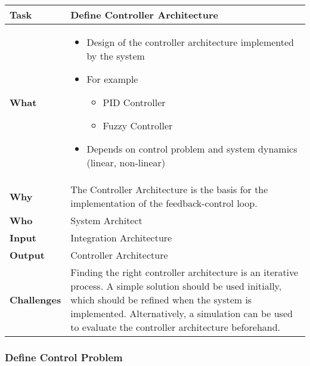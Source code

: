 \begin{tabularx}{\textwidth}{@{} l X @{}}
	\caption{Define Controller Architecture} \label{table:ch6_Task_Define_Controller_Architecture}\\
	\toprule 
	\bfseries Task & Define Controller Architecture\\
	\midrule 
	\bfseries What & 
	\begin{itemize}
		\item Design of the controller architecture implemented by the system
		\item For example
		\begin{itemize}
			\item PID Controller
			\item Fuzzy Controller
		\end{itemize}
		\item Depends on control problem and system dynamics (linear, non-linear)
	\end{itemize}
	\\
	\midrule 
	\bfseries Why & The Controller Architecture is the basis for the implementation of the feedback-control loop.\\
	\midrule 
	\bfseries Who & System Architect\\
	\midrule 
	\bfseries Input & Integration Architecture\\
	\midrule 
	\bfseries Output & Controller Architecture\\
	\midrule 
	\bfseries Challenges & Finding the right controller architecture is an iterative process. A simple solution should be used initially, which should be refined when the system is implemented. Alternatively, a simulation can be used to evaluate the controller architecture beforehand.\\
	\bottomrule 
\end{tabularx}

\subsubsection{Define Control Problem}


